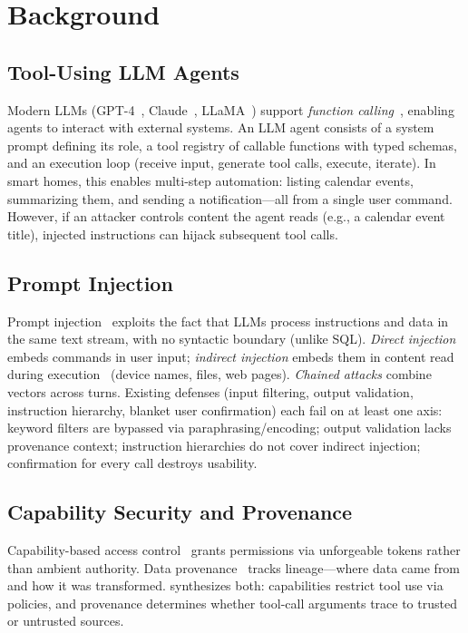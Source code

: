\section{Background}
\label{sec:background}

\subsection{Tool-Using LLM Agents}

Modern LLMs (GPT-4~\cite{openai-gpt4}, Claude~\cite{anthropic-claude}, LLaMA~\cite{llama}) support \emph{function calling}~\cite{schick2023toolformer}, enabling agents to interact with external systems. An LLM agent consists of a system prompt defining its role, a tool registry of callable functions with typed schemas, and an execution loop (receive input, generate tool calls, execute, iterate). In smart homes, this enables multi-step automation: listing calendar events, summarizing them, and sending a notification---all from a single user command. However, if an attacker controls content the agent reads (e.g., a calendar event title), injected instructions can hijack subsequent tool calls.

\subsection{Prompt Injection}

Prompt injection~\cite{perez2022ignore,greshake2023not} exploits the fact that LLMs process instructions and data in the same text stream, with no syntactic boundary (unlike SQL). \emph{Direct injection} embeds commands in user input; \emph{indirect injection} embeds them in content read during execution~\cite{greshake2023not} (device names, files, web pages). \emph{Chained attacks} combine vectors across turns. Existing defenses (input filtering, output validation, instruction hierarchy, blanket user confirmation) each fail on at least one axis: keyword filters are bypassed via paraphrasing/encoding; output validation lacks provenance context; instruction hierarchies do not cover indirect injection; confirmation for every call destroys usability.

\subsection{Capability Security and Provenance}

Capability-based access control~\cite{miller2006capability} grants permissions via unforgeable tokens rather than ambient authority. Data provenance~\cite{cheney2009provenance} tracks lineage---where data came from and how it was transformed. \sys{} synthesizes both: capabilities restrict tool use via policies, and provenance determines whether tool-call arguments trace to trusted or untrusted sources.
